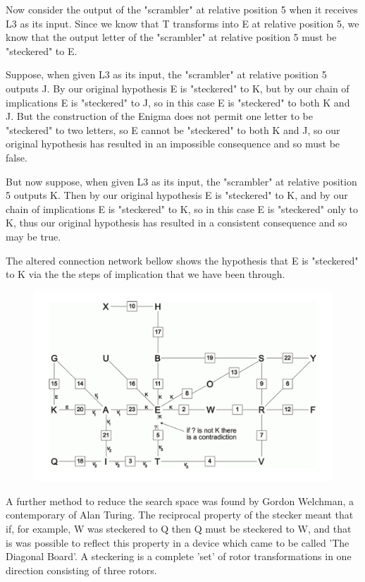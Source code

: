 \documentclass[12pt,a4paper]{article}
\begin{document}
Now consider the output of the "scrambler" at relative position 5 when it receives L3 as its input. Since we know that T transforms into E at relative position 5, we know that the output letter of the "scrambler" at relative position 5 must be "steckered" to E.

Suppose, when given L3 as its input, the "scrambler" at relative position 5 outputs J. By our original hypothesis E is "steckered" to K, but by our chain of implications E is "steckered" to J, so in this case E is "steckered" to both K and J. But the construction of the Enigma does not permit one letter to be "steckered" to two letters, so E cannot be "steckered" to both K and J, so our original hypothesis has resulted in an impossible consequence and so must be false.

But now suppose, when given L3 as its input, the "scrambler" at relative position 5 outputs K. Then by our original hypothesis E is "steckered" to K, and by our chain of implications E is "steckered" to K, so in this case E is "steckered" only to K, thus our original hypothesis has resulted in a consistent consequence and so may be true.

The altered connection network bellow shows the hypothesis that E is "steckered" to K via the the steps of implication that we have been through.

\begin{figure}[h]
\centering
\includegraphics[width=\textwidth]{StageThreeBOMBE.png}
\end{figure}

A further method to reduce the search space was found by Gordon Welchman, a contemporary of Alan Turing. The reciprocal property of the stecker meant that if, for example, W was steckered to Q then Q must be steckered to W, and that is was possible to reflect this property in a device which came to be called 'The Diagonal Board'. A steckering is a complete 'set' of rotor transformations in one direction consisting of three rotors. 
\end{document}
